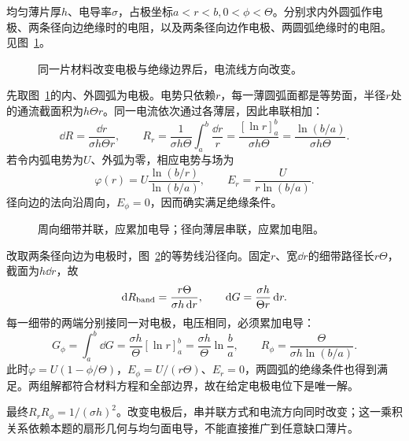 \begin{example}[扇形薄片的径向与周向电阻]\label{ex:c1-wedge}
均匀薄片厚$h$、电导率$\sigma$，占极坐标$a<r<b,0<\phi<\Theta$。分别求内外圆弧作电极、两条径向边绝缘时的电阻，以及两条径向边作电极、两圆弧绝缘时的电阻。 见图~\ref{fig:c1-wedge-q}。
\end{example}

\begin{figure}[H]\centering
{}
\caption{同一片材料改变电极与绝缘边界后，电流线方向改变。}\label{fig:c1-wedge-q}
\end{figure}
\begin{solution}
先取图~\ref{fig:c1-wedge-q}的内、外圆弧为电极。电势只依赖$r$，每一薄圆弧面都是等势面，半径$r$处的通流截面积为$h\Theta r$。同一电流依次通过各薄层，因此串联相加：
\[
 \dd R=\frac{\dd r}{\sigma h\Theta r},\qquad
 R_r=\frac1{\sigma h\Theta}\int_a^b\frac{\dd r}{r}
 =\frac{[\ln r]_a^b}{\sigma h\Theta}
 =\frac{\ln(b/a)}{\sigma h\Theta}.
\]
若令内弧电势为$U$、外弧为零，相应电势与场为
\[
 \varphi(r)=U\frac{\ln(b/r)}{\ln(b/a)},\qquad
 E_r=\frac{U}{r\ln(b/a)}.
\]
径向边的法向沿周向，$E_\phi=0$，因而确实满足绝缘条件。
\begin{figure}[H]\centering
{}
\caption{周向细带并联，应累加电导；径向薄层串联，应累加电阻。}\label{fig:c1-wedge-s}
\end{figure}
改取两条径向边为电极时，图~\ref{fig:c1-wedge-s}的等势线沿径向。固定$r$、宽$\dd r$的细带路径长$r\Theta$，截面为$h\dd r$，故
\[
 \mathop{}\!\mathrm d R_{\rm band}=\frac{r\Theta}{\sigma h\mathop{}\!\mathrm d r},\qquad
 \mathop{}\!\mathrm d G=\frac{\sigma h}{\Theta r}\mathop{}\!\mathrm d r.
\]
每一细带的两端分别接同一对电极，电压相同，必须累加电导：
\[
 G_\phi=\int_a^b\dd G=\frac{\sigma h}{\Theta}[\ln r]_a^b
 =\frac{\sigma h}{\Theta}\ln\frac ba,
 \qquad
 \boxed{R_\phi=\frac{\Theta}{\sigma h\ln(b/a)}}.
\]
此时$\varphi=U(1-\phi/\Theta)$，$E_\phi=U/(r\Theta)$、$E_r=0$，两圆弧的绝缘条件也得到满足。两组解都符合材料方程和全部边界，故在给定电极电位下是唯一解。

最终$R_rR_\phi=1/(\sigma h)^2$。改变电极后，串并联方式和电流方向同时改变；这一乘积关系依赖本题的扇形几何与均匀面电导，不能直接推广到任意缺口薄片。
\end{solution}

